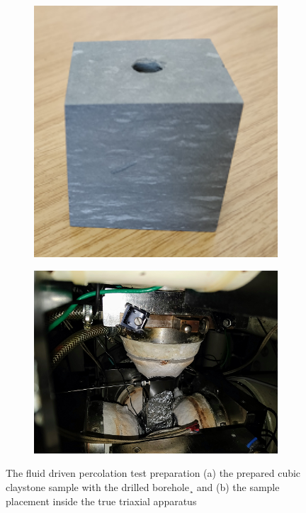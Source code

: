 \begin{figure}[!ht]
\begin{subfigure}[c]{0.48\textwidth}
\includegraphics[width=1\textwidth]{figures/Amir_Percolation_Sample1.png}
\subcaption{}
\label{fig:Amir_Percolation_Sample1}
\end{subfigure}
\hfill
\begin{subfigure}[c]{0.48\textwidth}
\includegraphics[width=1\textwidth]{figures/Amir_Percolation_Setup.png}
\subcaption{}
\label{fig:Amir_Percolation_Setup}
\end{subfigure}
\caption{The fluid driven percolation test preparation (a) the prepared cubic claystone sample with the drilled borehole¸ and (b) the sample placement inside the true triaxial apparatus}
\end{figure}


